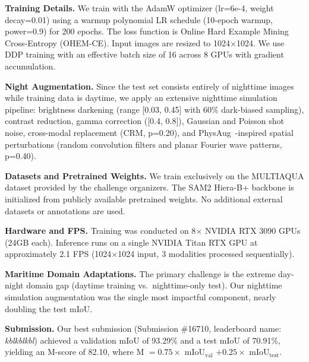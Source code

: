 \documentclass[10pt,twocolumn,letterpaper]{article}
\begin{document}
\noindent\textbf{Training Details.}
We train with the AdamW optimizer (lr=6e-4, weight decay=0.01) using a warmup polynomial LR schedule (10-epoch warmup, power=0.9) for 200 epochs.
The loss function is Online Hard Example Mining Cross-Entropy (OHEM-CE).
Input images are resized to 1024$\times$1024.
We use DDP training with an effective batch size of 16 across 8 GPUs with gradient accumulation.

\noindent\textbf{Night Augmentation.}
Since the test set consists entirely of nighttime images while training data is daytime, we apply an extensive nighttime simulation pipeline:
brightness darkening (range [0.03, 0.45] with 60\% dark-biased sampling), contrast reduction, gamma correction ([0.4, 0.8]), Gaussian and Poisson shot noise, cross-modal replacement (CRM, p=0.20), and PhysAug~\cite{xu2025physaug}-inspired spatial perturbations (random convolution filters and planar Fourier wave patterns, p=0.40).

\noindent\textbf{Datasets and Pretrained Weights.}
We train exclusively on the MULTIAQUA dataset provided by the challenge organizers.
The SAM2 Hiera-B+ backbone is initialized from publicly available pretrained weights.
No additional external datasets or annotations are used.

\noindent\textbf{Hardware and FPS.}
Training was conducted on 8$\times$ NVIDIA RTX 3090 GPUs (24GB each).
Inference runs on a single NVIDIA Titan RTX GPU at approximately 2.1 FPS (1024$\times$1024 input, 3 modalities processed sequentially).

\noindent\textbf{Maritime Domain Adaptations.}
The primary challenge is the extreme day-night domain gap (daytime training vs.\ nighttime-only test).
Our nighttime simulation augmentation was the single most impactful component, nearly doubling the test mIoU.

\noindent\textbf{Submission.}
Our best submission (Submission \#16710, leaderboard name: \textit{kblkblkbl}) achieved a validation mIoU of 93.29\% and a test mIoU of 70.91\%, yielding an M-score of 82.10, where M $= 0.75 \times$ mIoU$_{\mathrm{val}}$ $+ 0.25 \times$ mIoU$_{\mathrm{test}}$.

{\small


}
\end{document}
